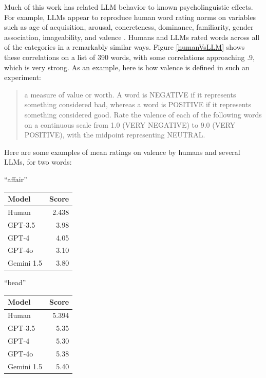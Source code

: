 Much of this work has related LLM behavior to known psycholinguistic effects.
For example, LLMs appear to reproduce human word rating norms on variables such
as  age of acquisition, arousal, concreteness, dominance, familiarity, gender
association, imageability, and valence \cite{trott2024augment,
kello2024emergent}. Humans and LLMs rated words across all of the categories in
a remarkably similar ways. Figure \ref{humanVsLLM} shows these
correlations on a list of 390 words, with some correlations approaching .9,
which is very strong.  As an example, here is how valence is defined in such an
experiment:
\begin{quote}
a measure of value or worth. A word is NEGATIVE if it represents something
considered bad, whereas a word is POSITIVE if it represents something
considered good. Rate the valence of each of the following words on a
continuous scale from 1.0 (VERY NEGATIVE) to 9.0 (VERY POSITIVE), with the
midpoint representing NEUTRAL.
\end{quote}
Here are some examples of mean ratings on valence by humans and several LLMs,
for two words:

\begin{center}
\begin{minipage}{0.45\linewidth}
\centering
``affair''\\[6pt]
\begin{tabular}{@{}lr@{}}
\textbf{Model} & \textbf{Score}\\\hline
Human & 2.438\\
GPT-3.5 & 3.98\\
GPT-4 & 4.05\\
GPT-4o & 3.10\\
Gemini 1.5 & 3.80\\
\end{tabular}
\end{minipage}
\hspace{0.05\linewidth}
\begin{minipage}{0.45\linewidth}
\centering
``bead''\\[6pt] 
\begin{tabular}{@{}lr@{}}
\textbf{Model} & \textbf{Score}\\\hline
Human & 5.394\\
GPT-3.5 & 5.35\\
GPT-4 & 5.30\\
GPT-4o & 5.38\\
Gemini 1.5 & 5.40\\
\end{tabular}
\end{minipage}
\end{center}

